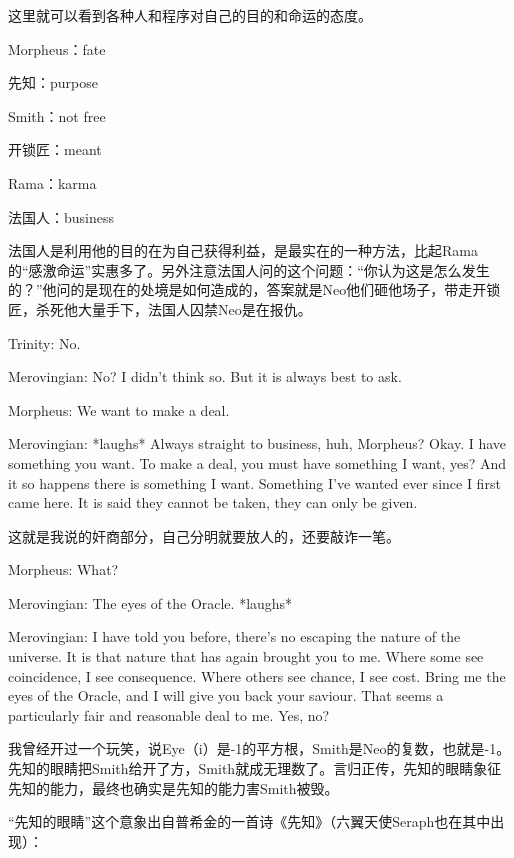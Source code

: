 \documentclass[UTF8]{ctexart}
\newenvironment{myquote}{\color{green} \setlength{\leftskip}{6em} \setlength{\rightskip}{4em} \setlength{\parindent}{-2em}}{\par}
\begin{document}
这里就可以看到各种人和程序对自己的目的和命运的态度。

Morpheus：fate

先知：purpose

Smith：not free

开锁匠：meant

Rama：karma

法国人：business

法国人是利用他的目的在为自己获得利益，是最实在的一种方法，比起Rama的“感激命运”实惠多了。另外注意法国人问的这个问题：“你认为这是怎么发生的？”他问的是现在的处境是如何造成的，答案就是Neo他们砸他场子，带走开锁匠，杀死他大量手下，法国人囚禁Neo是在报仇。

\begin{myquote}
Trinity: No.

Merovingian: No? I didn't think so. But it is always best to ask.

Morpheus: We want to make a deal.

Merovingian: *laughs* Always straight to business, huh, Morpheus? Okay. I have something you want. To make a deal, you must have something I want, yes? And it so happens there is something I want. Something I've wanted ever since I first came here. It is said they cannot be taken, they can only be given.
\end{myquote}

这就是我说的奸商部分，自己分明就要放人的，还要敲诈一笔。

\begin{myquote}
Morpheus: What?

Merovingian: The eyes of the Oracle. *laughs*

Merovingian: I have told you before, there's no escaping the nature of the universe. It is that nature that has again brought you to me. Where some see coincidence, I see consequence. Where others see chance, I see cost. Bring me the eyes of the Oracle, and I will give you back your saviour. That seems a particularly fair and reasonable deal to me. Yes, no?
\end{myquote}

我曾经开过一个玩笑，说Eye（i）是-1的平方根，Smith是Neo的复数，也就是-1。先知的眼睛把Smith给开了方，Smith就成无理数了。言归正传，先知的眼睛象征先知的能力，最终也确实是先知的能力害Smith被毁。

“先知的眼睛”这个意象出自普希金的一首诗《先知》（六翼天使Seraph也在其中出现）：
\end{document}
